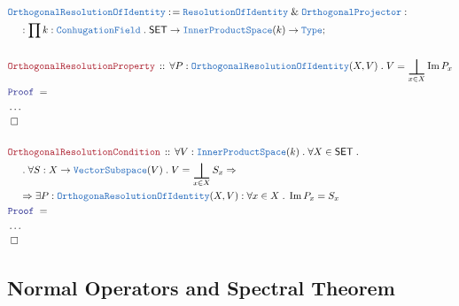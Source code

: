 \documentclass[12pt]{scrartcl}%
\newcommand{\TYPE}[1]{\textcolor{NavyBlue}{\mathtt{#1}}}%
\newcommand{\LOGIC}[1]{\textcolor{Blue}{\mathtt{#1}}}%
\newcommand{\THM}[1]{\textcolor{Maroon}{\mathtt{#1}}}%
\renewcommand{\.}{\; . \;} %
\newcommand{\de}{: \kern 0.1pc =} %
\newcommand{\Theorem}[2]{& \THM{#1} \, :: \, #2 \\ & \Proof = \\ } %
\newcommand{\NewLine}{\\ & \kern 1pc}%
\newcommand{\Page}[1]{ \begin{align*} #1 \end{align*}  }%
\newcommand{\NoProof}{ & \ldots \\ \EndProof}%
\renewcommand{\And}{\; \& \;}%
\newcommand{\Type}{\TYPE{Type}}%
\DeclareMathOperator*{\im}{Im}%
\newcommand{\Conclude}[3]{& #1 \de #2 : #3; \\}%
\newcommand{\QED}{\; \square} %
\newcommand{\EndProof}{& \QED \\} %
\newcommand{\Proof}{\LOGIC{Proof} \; } %
\newcommand{\SET}{\mathsf{SET}} %
\newcommand{\IPS}{\TYPE{InnerProductSpace}}
\DeclareMathOperator{\bigbot}{\scalerel*{\bot}{\sum}} %
\begin{document}
\Page{
	\Conclude{\TYPE{OrthogonalResolutionOfIdentity}}{\TYPE{ResolutionOfIdentity} \And \TYPE{OrthogonalProjector}}
	{ \NewLine : \prod k : \TYPE{ConhugationField} \.  \SET \to \IPS(k) \to \Type }
	\\
	\Theorem{OrthogonalResolutionProperty}{ \forall P : \TYPE{OrthogonalResolutionOfIdentity}(X,V) \. V = \bigbot_{x \in X} \im P_x   }
	\NoProof
	\\
	\Theorem{OrthogonalResolutionCondition}{ 
		\forall V : \IPS(k) \. 
		\forall X \in \SET \. \NewLine \.
		\forall S : X \to \TYPE{VectorSubspace}(V) \. 
		V = \bigbot_{x \in X} S_x \Rightarrow \NewLine \Rightarrow
		\exists P : \TYPE{OrthogonaResolutionOfIdentity}(X,V) :
		\forall x \in X \. \im P_x = S_x		
		}
	\NoProof
}
\newpage
\subsection{Normal Operators and Spectral Theorem}
\end{document}
